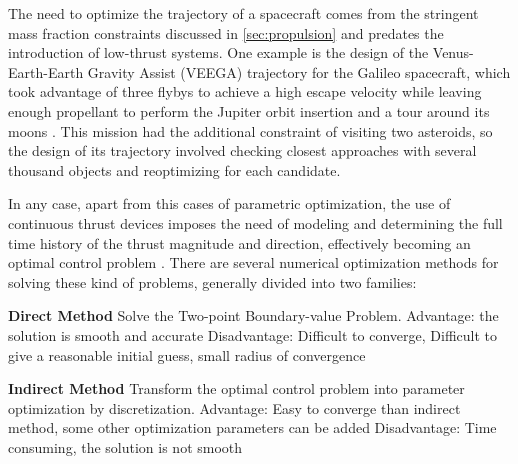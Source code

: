 The need to optimize the trajectory of a spacecraft comes from the stringent mass fraction constraints discussed in \ref{sec:propulsion} and predates the introduction of low-thrust systems. One example is the design of the Venus-Earth-Earth Gravity Assist (VEEGA) trajectory for the Galileo spacecraft, which took advantage of three flybys to achieve a high escape velocity while leaving enough propellant to perform the Jupiter orbit insertion and a tour around its moons \cite{damario1989galileo}. This mission had the additional constraint of visiting two asteroids, so the design of its trajectory involved checking closest approaches with several thousand objects and reoptimizing for each candidate.
% 
% 

In any case, apart from this cases of parametric optimization, the use of continuous thrust devices imposes the need of modeling and determining the full time history of the thrust magnitude and direction, effectively becoming an optimal control problem \cite{conway2010spacecraft}. There are several numerical optimization methods for solving these kind of problems, generally divided into two families:
% 
% 

% 
% 
% 
% 
\textbf{Direct Method}
Solve the Two-point Boundary-value Problem.
Advantage: the solution is smooth and accurate
Disadvantage: Difficult to converge, Difficult to give a reasonable initial guess, small radius of convergence 
% 
% 

\textbf{Indirect Method}
Transform the optimal control problem into parameter 
optimization by discretization.
Advantage: Easy to converge than indirect method, some other optimization parameters can be added
% 
% 
Disadvantage: Time consuming, the solution is not smooth 

